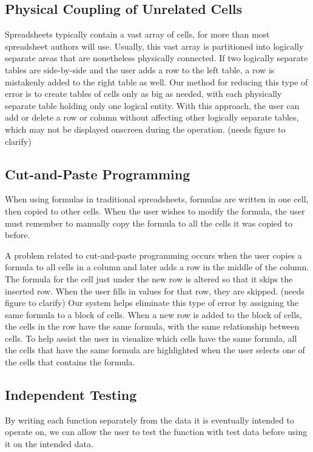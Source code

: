 \documentclass{acm_proc_article-sp}
\begin{document}
\subsection{Physical Coupling of Unrelated Cells}
Spreadsheets typically contain a vast array of cells, for more than
most spreadsheet authors will use. Usually, this vast array is
partitioned into logically separate areas that are nonetheless
physically connected. If two logically separate tables are
side-by-side and the user adds a row to the left table, a row is
mistakenly added to the right table as well. Our method for reducing
this type of error is to create tables of cells only as big as needed,
with each physically separate table holding only one logical
entity. With this approach, the user can add or delete a row or column
without affecting other logically separate tables, which may not be
displayed onscreen during the operation. (needs figure to clarify)

\subsection{Cut-and-Paste Programming}
When using formulas in traditional spreadsheets, formulas are written
in one cell, then copied to other cells. When the user wishes to
modify the formula, the user must remember to manually copy the
formula to all the cells it was copied to before.

A problem related to cut-and-paste programming occurs when the user
copies a formula to all cells in a column and later adds a row in the
middle of the column. The formula for the cell just under the new row
is altered so that it skips the inserted row. When the user fills in
values for that row, they are skipped. (needs figure to clarify) Our
system helps eliminate this type of error by assigning the same
formula to a block of cells. When a new row is added to the block of
cells, the cells in the row have the same formula, with the same
relationship between cells. To help assist the user in visualize which
cells have the same formula, all the cells that have the same formula
are highlighted when the user selects one of the cells that contains
the formula.

\subsection{Independent Testing}
By writing each function separately from the data it is eventually
intended to operate on, we can allow the user to test the function
with test data before using it on the intended data.
\end{document}
